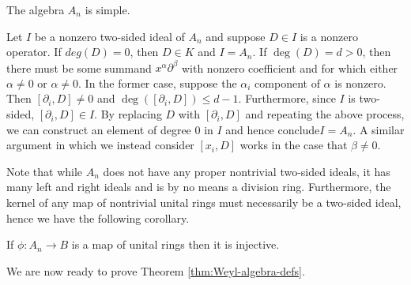 \begin{thm}\label{thm:Weyl-algebra-simple}
	The algebra $A_n$ is simple.
\end{thm}
\begin{prf}
	Let $I$ be a nonzero two-sided ideal of $A_n$ and suppose $D \in I$ is a nonzero operator. If $deg(D) = 0$, then $D \in K$ and $I = A_n$. If $\deg(D) = d > 0$, then there must be some summand $x^\alpha\partial^\beta$ with nonzero coefficient and for which either $\alpha \neq 0$ or $\alpha \neq 0$. In the former case, suppose the $\alpha_i$ component of $\alpha$ is nonzero. Then $[\partial_i,D] \neq 0$ and $\deg([\partial_i,D]) \leq d - 1$. Furthermore, since $I$ is two-sided, $[\partial_i,D] \in I$. By replacing $D$ with $[\partial_i,D]$ and repeating the above process, we can construct an element of degree 0 in $I$ and hence conclude$I = A_n$. A similar argument in which we instead consider $[x_i,D]$ works in the case that $\beta \neq 0$.
\end{prf}
Note that while $A_n$ does not have any proper nontrivial two-sided ideals, it has many left and right ideals and is by no means a division ring. Furthermore, the kernel of any map of nontrivial unital rings must necessarily be a two-sided ideal, hence we have the following corollary.
\begin{cor}\label{cor:maps-from-Weyl-inj}
	If $\phi:A_n\to B$ is a map of unital rings then it is injective.
\end{cor}
We are now ready to prove Theorem \ref{thm:Weyl-algebra-defs}.
